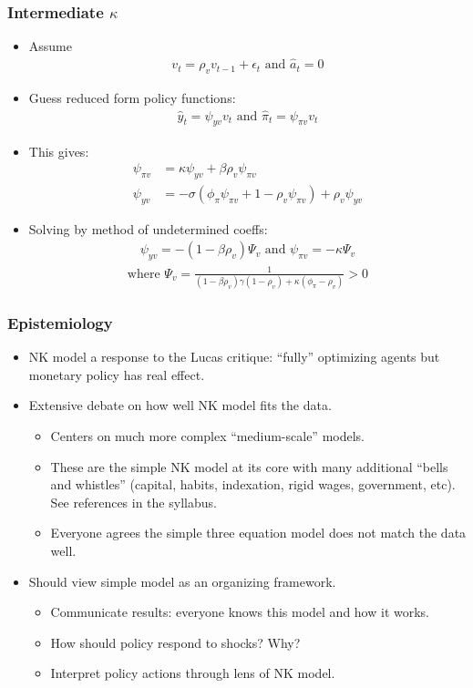 \documentclass[11pt,aspectratio=169,xcolor={dvipsnames},hyperref={pdftex,pdfpagemode=UseNone,hidelinks,pdfdisplaydoctitle=true},usepdftitle=false]{beamer}
\begin{document}
\begin{frame}
\frametitle{Intermediate $\kappa$}
\begin{itemize}
	\item Assume
	\begin{align*}
		v_t = \rho_v v_{t-1}+\epsilon_t \text{ and }\hat{a}_{t}=0
	\end{align*}
	\item Guess reduced form policy functions:
	\begin{align*}
		\hat{y}_t=\psi_{yv}v_t\text{ and }\hat{\pi}_t=\psi_{\pi v}v_t
	\end{align*}
	\item This gives:
	\begin{align*}
		\psi_{\pi v}&=\kappa\psi_{yv}+\beta\rho_v\psi_{\pi v}\\
		\psi_{y v}&=-\sigma(\phi_\pi \psi_{\pi v} + 1 -\rho_v \psi_{\pi v})+\rho_v \psi_{y v}
	\end{align*}
	\item Solving by method of undetermined coeffs:
	\begin{align*}
		\psi_{y v}=-(1-\beta\rho_v)\Psi_v\text{ and }\psi_{\pi v}=-\kappa \Psi_v
	\end{align*}
	\begin{align*}
		\text{where } \Psi_v=\frac{1}{(1-\beta\rho_v)\gamma(1-\rho_v)+\kappa(\phi_\pi-\rho_v)}>0
	\end{align*}
\end{itemize}
\end{frame}


\begin{frame}
\frametitle{Epistemiology}
\begin{itemize}
	\item NK model a response to the Lucas critique: ``fully'' optimizing agents but monetary policy has real effect.
	\item Extensive debate on how well NK model fits the data.
	\begin{itemize}
		\item Centers on much more complex ``medium-scale'' models.
		\item These are the simple NK model at its core with many additional ``bells and whistles'' (capital, habits, indexation, rigid wages, government, etc).  See references in the syllabus.
		\item Everyone agrees the simple three equation model does not match the data well.
	\end{itemize}
	\item Should view simple model as an organizing framework.
	\begin{itemize}
		\item Communicate results: everyone knows this model and how it works.
		\item How should policy respond to shocks? Why?
		\item Interpret policy actions through lens of NK model.
	\end{itemize}
\end{itemize}
\end{frame}
\end{document}
